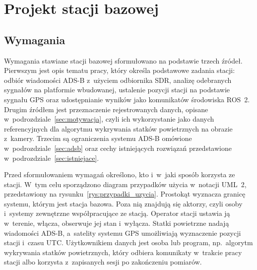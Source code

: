 
\chapter{Projekt stacji bazowej}
\label{chap:projekt}

\section{Wymagania}
\label{sec:wymagania}

Wymagania stawiane stacji bazowej sformułowano na podstawie trzech źródeł. Pierwszym jest opis tematu pracy, który określa podstawowe zadania stacji: odbiór wiadomości ADS-B z~użyciem odbiornika SDR, analizę odebranych sygnałów na platformie wbudowanej, ustalenie pozycji stacji na podstawie sygnału GPS oraz udostępnianie wyników jako komunikatów środowiska ROS~2. Drugim źródłem jest przeznaczenie rejestrowanych danych, opisane w~podrozdziale~\ref{sec:motywacja}, czyli ich wykorzystanie jako danych referencyjnych dla algorytmu wykrywania statków powietrznych na obrazie z~kamery. Trzecim są ograniczenia systemu ADS-B omówione w~podrozdziale~\ref{sec:adsb} oraz cechy istniejących rozwiązań przedstawione w~podrozdziale~\ref{sec:istniejace}.

Przed sformułowaniem wymagań określono, kto i~w~jaki sposób korzysta ze stacji. W~tym celu sporządzono diagram przypadków użycia w~notacji UML~2, przedstawiony na rysunku~\ref{rys:przypadki_uzycia}. Prostokąt wyznacza granicę systemu, którym jest stacja bazowa. Poza nią znajdują się aktorzy, czyli osoby i~systemy zewnętrzne współpracujące ze stacją. Operator stacji ustawia ją w~terenie, włącza, obserwuje jej stan i~wyłącza. Statki powietrzne nadają wiadomości ADS-B, a~satelity systemu GPS umożliwiają wyznaczenie pozycji stacji i~czasu UTC. Użytkownikiem danych jest osoba lub program, np.\ algorytm wykrywania statków powietrznych, który odbiera komunikaty w~trakcie pracy stacji albo korzysta z~zapisanych sesji po zakończeniu pomiarów.

